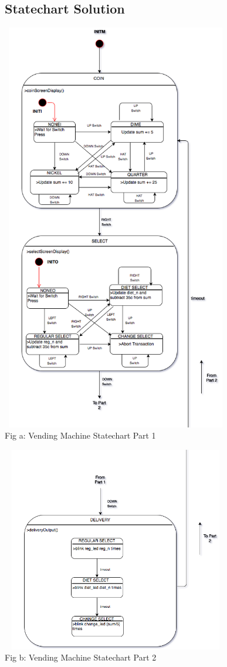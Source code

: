 \documentclass[a4paper,12pt,oneside]{book}
\begin{document}
\subsection{Statechart Solution}
\begin{center}
\includegraphics[width=10cm, height=18cm]{VendingMachineImages/VendingMachineStatechart1}
\\ {\small Fig a: Vending Machine Statechart Part 1}
\end{center}
\begin{center}
\includegraphics[width=10cm, height=9cm]{VendingMachineImages/VendingMachineStatechart2}
\\ {\small Fig b: Vending Machine Statechart Part 2}
\end{center}
\end{document}
